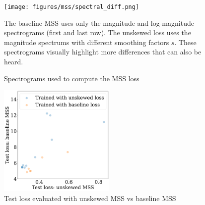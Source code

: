 \begin{figure}
    \centering
    \texttt{[image: figures/mss/spectral\_diff.png]}
    \caption{Spectrograms used to compute the MSS loss}
    \small{The baseline MSS uses only the magnitude and log-magnitude spectrograms (first and last row). The unskewed loss uses the magnitude spectrums with different smoothing factors $s$. These spectrograms visually highlight more differences that can also be heard.}
    \label{fig:mss-loss}
\end{figure}


\begin{figure}
    \centering
    \includegraphics[width=0.5\textwidth]{figures/mss/performance_scatter.png}
    \caption{Test loss evaluated with unskewed MSS vs baseline MSS}
    \label{fig:unskewed-vs-spectral}
\end{figure}



